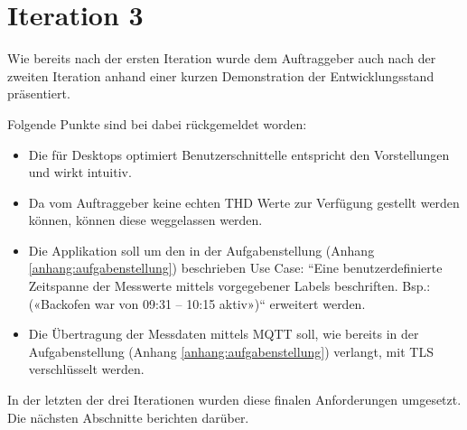 \section{Iteration 3}
\label{i3}
Wie bereits nach der ersten Iteration wurde dem Auftraggeber auch nach der zweiten Iteration
anhand einer kurzen Demonstration der Entwicklungsstand präsentiert.

Folgende Punkte sind bei dabei rückgemeldet worden:
\begin{itemize}
    \item Die für Desktops optimiert Benutzerschnittelle entspricht den Vorstellungen und wirkt intuitiv.
    \item Da vom Auftraggeber keine echten \ac{THD} Werte zur Verfügung gestellt werden können,
          können diese weggelassen werden.
    \item Die Applikation soll um den in der Aufgabenstellung (Anhang \ref{anhang:aufgabenstellung}) beschrieben Use Case:
          ``Eine benutzerdefinierte Zeitspanne der Messwerte mittels vorgegebener
          Labels beschriften. Bsp.: («Backofen war von 09:31 – 10:15 aktiv»)`` erweitert werden.
    \item Die Übertragung der Messdaten mittels \ac{MQTT} soll,
          wie bereits in der Aufgabenstellung (Anhang \ref{anhang:aufgabenstellung}) verlangt, mit \ac{TLS} verschlüsselt werden.
\end{itemize}
In der letzten der drei Iterationen wurden diese finalen Anforderungen umgesetzt.
Die nächsten Abschnitte berichten darüber.

